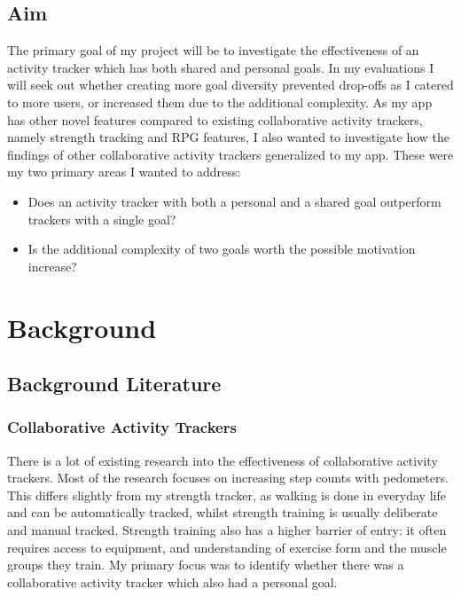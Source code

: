 \documentclass{l4proj}
\begin{document}
%
%
%

\section{Aim}
The primary goal of my project will be to investigate the effectiveness of an activity tracker which has both shared and personal goals. In my evaluations I will seek out whether creating more goal diversity prevented drop-offs as I catered to more users, or increased them due to the additional complexity. As my app has other novel features compared to existing collaborative activity trackers, namely strength tracking and RPG features, I also wanted to investigate how the findings of other collaborative activity trackers generalized to my app. These were my two primary areas I wanted to address:
\begin{itemize}
  \item Does an activity tracker with both a personal and a shared goal outperform trackers with a single goal?
  \item Is the additional complexity of two goals worth the possible motivation increase?
\end{itemize}
  




\chapter{Background}

\section{Background Literature}

\subsection{Collaborative Activity Trackers}
There is a lot of existing research into the effectiveness of collaborative activity trackers. Most of the research focuses on increasing step counts with pedometers. This differs slightly from my strength tracker, as walking is done in everyday life and can be automatically tracked, whilst strength training is usually deliberate and manual tracked. Strength training also has a higher barrier of entry: it often requires access to equipment, and understanding of exercise form and the muscle groups they train. My primary focus was to identify whether there was a collaborative activity tracker which also had a personal goal.
\end{document}
